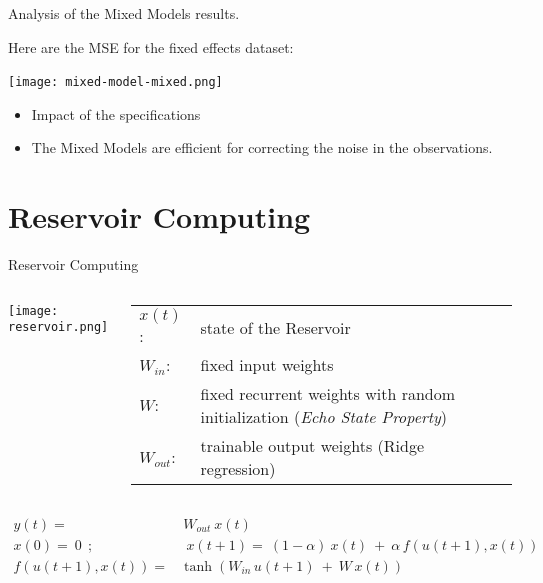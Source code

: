 \documentclass{beamer}
\begin{document}
\begin{frame}{Analysis of the Mixed Models results.}

Here are the MSE for the fixed effects dataset:
\medskip

\centering
\texttt{[image: mixed-model-mixed.png]}
\

\medskip

\begin{itemize}
	\item Impact of the specifications\\
	\item The Mixed Models are efficient for correcting the noise in the observations.
\end{itemize}

\end{frame}




\section{Reservoir Computing}

\begin{frame}{Reservoir Computing}
	\begin{columns}
		\begin{column}{0.4\textwidth}
			\texttt{[image: reservoir.png]}
		\end{column}
		\begin{column}{0.6\textwidth}
		\begin{tabularx}{\textwidth}{lX}
			$x(t)$: & state of the Reservoir\\
			$W_{in}$: & fixed input weights\\
			$W$: & fixed recurrent weights with random initialization \newline (\textit{Echo State Property})\\
			$W_{out}$: & trainable output weights (Ridge regression)\\
		\end{tabularx}				
		\end{column}
\end{columns} 
	
	\begin{align*}
		y(t) = & ~ W_{out} ~  x(t) \\
		x(0) =  ~ 0 ~~; & ~~ x(t+1) = ~ (1-\alpha ) ~ x(t) ~ + \: \alpha \, f(u(t+1),x(t)) \\
		f(u(t+1),x(t)) = & \tanh (W_{in} \, u(t+1) \: + \: W \, x(t) ) \\
	\end{align*}




\end{frame}
\end{document}
